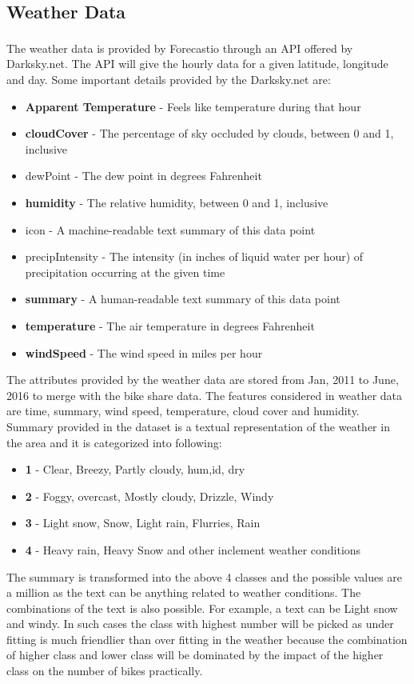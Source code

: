 \documentclass[journal, a4paper]{IEEEtran}
\begin{document}
\subsection{Weather Data}
\indent The weather data\textsuperscript{\cite{weatherdata}} is provided by Forecastio through an API offered by Darksky.net. The API will give the hourly data for a given latitude, longitude and day. Some important details provided by the Darksky.net are:
\begin{itemize}
\item \textbf{Apparent Temperature} - Feels like temperature during that hour
\item \textbf{cloudCover} - The percentage of sky occluded by clouds, between 0 and 1, inclusive
\item dewPoint - The dew point in degrees Fahrenheit
\item \textbf{humidity} - The relative humidity, between 0 and 1, inclusive
\item icon - A machine-readable text summary of this data point
\item precipIntensity - The intensity (in inches of liquid water per hour) of precipitation occurring at the given time
\item \textbf{summary} - A human-readable text summary of this data point
\item \textbf{temperature} - The air temperature in degrees Fahrenheit
\item \textbf{windSpeed} - The wind speed in miles per hour
\end{itemize}
\indent The attributes provided by the weather data are stored from Jan, 2011 to June, 2016 to merge with the bike share data. The features considered in weather data are time, summary, wind speed, temperature, cloud cover and humidity. Summary provided in the dataset is a textual representation of the weather in the area and it is categorized into following:
\begin{itemize}
\item \textbf{1} - Clear, Breezy, Partly cloudy, hum,id, dry
\item \textbf{2} - Foggy, overcast, Mostly cloudy, Drizzle, Windy
\item \textbf{3} - Light snow, Snow, Light rain, Flurries, Rain
\item \textbf{4} - Heavy rain, Heavy Snow and other inclement weather conditions
\end{itemize}
\indent The summary is transformed into the above 4 classes and the possible values are a million as the text can be anything related to weather conditions. The combinations of the text is also possible. For example, a text can be Light snow and windy. In such cases the class with highest number will be picked as under fitting is much friendlier than over fitting in the weather because the combination of higher class and lower class will be dominated by the impact of the higher class on the number of bikes practically.
\end{document}
